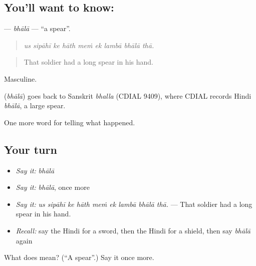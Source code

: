 \subsection*{You'll want to know: }
\textbf{} — \emph{bhālā} — \textquotedblleft{}a spear\textquotedblright{}.

\begin{quote}
        
\end{quote}

\begin{quote}
\emph{us sipāhī ke hāth meṁ ek lambā bhālā thā.}
\end{quote}

\begin{quote}
That soldier had a long spear in his hand.
\end{quote}

Masculine.

\begin{cousinweb}
\textbf{} (\emph{bhālā}) goes back to Sanskrit \emph{bhalla} (CDIAL 9409), where CDIAL records Hindi \emph{bhālā}, a large spear.
\end{cousinweb}

\begin{grammarlens}[title={What you've built}]
One more word for telling what happened.
\end{grammarlens}

\subsection*{Your turn}
\begin{itemize}
\raggedright
  \item \emph{Say it:} \emph{bhālā}
  \item \emph{Say it:} \emph{bhālā}, once more
  \item \emph{Say it:} \emph{us sipāhī ke hāth meṁ ek lambā bhālā thā.} — That soldier had a long spear in his hand.
  \item \emph{Recall:} say the Hindi for a sword, then the Hindi for a shield, then say \emph{bhālā} again
\end{itemize}

\begin{tcolorbox}[breakable,colback=teal!4,colframe=teal!35!black,title={Before you move on}]
What does  mean? (\textquotedblleft{}A spear\textquotedblright{}.) Say it once more.
\end{tcolorbox}
